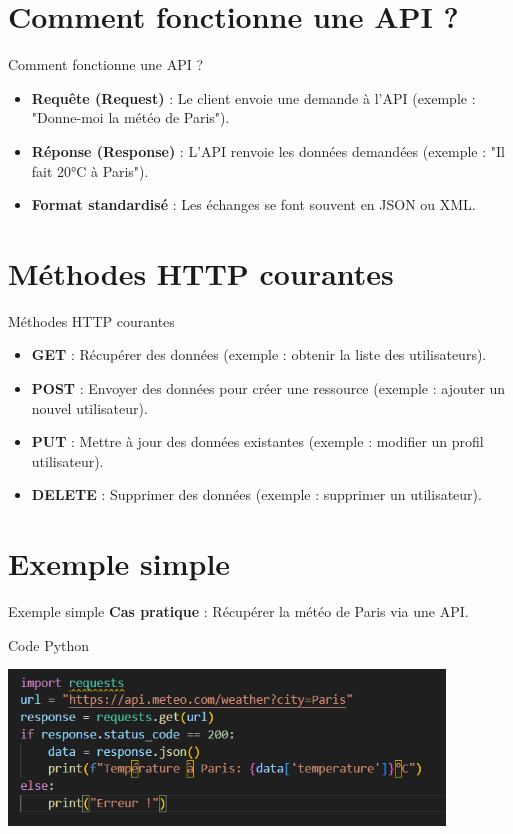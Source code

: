 \documentclass{clbeamer2024}
\begin{document}
\section{Comment fonctionne une API ?}
\begin{frame}{Comment fonctionne une API ?}
	\begin{itemize}
		\item \textbf{Requête (Request)} : Le client envoie une demande à l'API (exemple : "Donne-moi la météo de Paris").
		\item \textbf{Réponse (Response)} : L'API renvoie les données demandées (exemple : "Il fait 20°C à Paris").
		\item \textbf{Format standardisé} : Les échanges se font souvent en JSON ou XML.
	\end{itemize}
\end{frame}

\section{Méthodes HTTP courantes}
\begin{frame}{Méthodes HTTP courantes}
	\begin{itemize}
		\item \textbf{GET} : Récupérer des données (exemple : obtenir la liste des utilisateurs).
		\item \textbf{POST} : Envoyer des données pour créer une ressource (exemple : ajouter un nouvel utilisateur).
		\item \textbf{PUT} : Mettre à jour des données existantes (exemple : modifier un profil utilisateur).
		\item \textbf{DELETE} : Supprimer des données (exemple : supprimer un utilisateur).
	\end{itemize}
\end{frame}


\section{Exemple simple}
\begin{frame}{Exemple simple}
	\textbf{Cas pratique} : Récupérer la météo de Paris via une API.
	
	\begin{exampleblock}{Code Python}
		\begin{center}
			\includegraphics[width=0.87\textwidth]{exemple.png}
		\end{center}
	\end{exampleblock}
	
\end{frame}
\end{document}
